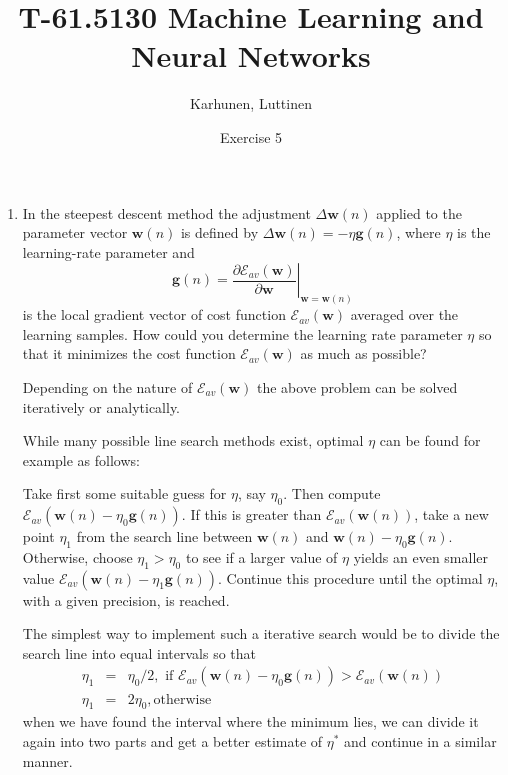 
\title{T-61.5130 Machine Learning and Neural Networks}
\author{Karhunen, Luttinen}
\date{Exercise 5}

\usepackage{url}

\newcommand{\vect}[1]{{\bf{#1}}}
\newcommand{\svect}[1]{\boldsymbol{#1}}
\newcommand{\matr}[1]{\boldsymbol{#1}}




\maketitle

\begin{enumerate}
  
\item In the steepest descent method the adjustment
  $\Delta\mathbf{w}(n)$ applied to the parameter vector
  $\mathbf{w}(n)$ is defined by
  $\Delta\mathbf{w}(n)=-\eta\mathbf{g}(n)$, where $\eta$ is the
  learning-rate parameter and
  \begin{equation*}
    \mathbf{g}(n)=\left.\frac{\partial
        \mathcal{E}_{av}(\mathbf{w})}{\partial \mathbf{w}}\right|_{\mathbf{w}=\mathbf{w}(n)}
  \end{equation*}
  is the local gradient vector of cost
  function $\mathcal{E}_{av}(\mathbf{w})$ averaged over the learning
  samples. How could you determine the learning rate parameter $\eta$ so
  that it minimizes the cost function $\mathcal{E}_{av}(\mathbf{w})$ as much as possible?

  \begin{solution}

    Depending on the nature of $\mathcal{E}_{av}(\mathbf{w})$ the above
    problem can be solved iteratively or analytically.

    While many possible line search methods exist,
    optimal $\eta$ can be found for example as follows:

    Take first some suitable guess for $\eta$, say $\eta_0$. Then compute
    $\mathcal{E}_{av}(\mathbf{w}(n)-\eta_0\mathbf{g}(n))$. If this is
    greater than $\mathcal{E}_{av}(\mathbf{w}(n))$, take a new point
    $\eta_1$ from the search line between $\mathbf{w}(n)$ and
    $\mathbf{w}(n)-\eta_0\mathbf{g}(n)$. Otherwise, choose $\eta_1>\eta_0$
    to see if a larger value of $\eta$ yields an even smaller value
    $\mathcal{E}_{av}(\mathbf{w}(n)-\eta_1\mathbf{g}(n))$. Continue this
    procedure until the optimal $\eta$, with a given precision, is reached.

    The simplest way to implement such a iterative search would be to
    divide the search line into equal intervals so that
    \begin{eqnarray*}
      \eta_1&=&\eta_0/2, \mbox{ if
      }\mathcal{E}_{av}(\mathbf{w}(n)-\eta_0\mathbf{g}(n))>\mathcal{E}_{av}(\mathbf{w}(n))\\
      \eta_1&=&2\eta_0, \mbox{otherwise}
    \end{eqnarray*}
    when we have found the interval where the minimum lies, we can divide
    it again into two parts and get a better estimate of $\eta^*$ and continue in a similar manner.


\end{solution}
\end{enumerate}
